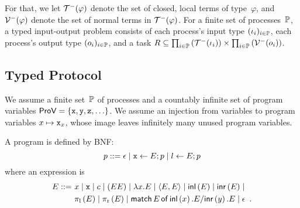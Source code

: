 {For that, we let $\mathcal{T}^-(\varphi)$ denote the set of closed, local terms of
type~$\varphi$,
and $\mathcal{V}^-(\varphi)$ denote the set of normal terms in $\mathcal{T}^-(\varphi)$.
For a finite set of processes~$\mathbb{P}$,
a typed input-output problem consists of each process's input type
$(\iota_i)_{i\in \mathbb{P}}$, each process's output type $(o_i)_{i\in
\mathbb{P}}$, and a
task $R\subseteq \prod_{i\in \mathbb{P}}\left(\mathcal{T}^-(\iota_i)\right)\times
 \prod_{i\in \mathbb{P}}\left(\mathcal{V}^-(o_i)\right)$.

\subsection{Typed Protocol}

We assume a finite set~$\mathbb{P}$
of processes and a countably infinite
set of program variables $\mathsf{ProV} =\{\texttt{x}, \texttt{y}, \texttt{z}, \ldots\}$.
We assume an injection from variables to program variables $x\mapsto
\texttt{x}_x$, whose image leaves infinitely many unused program variables.

A program is defined by BNF:
\[
 p ::= \epsilon\mid
 \texttt{x}\leftarrow E; p \mid
 l \leftarrow E; p
\]
where an expression is
\begin{align*}
 E
 ::=\,\,
 &x\mid \texttt{x} \mid c \mid (EE)\mid \lambda
 x.E\mid \langle{E,E}\rangle\mid \mathsf{inl}\left({E}\right)\mid \mathsf{inr}\left({E}\right)\mid \\
 &\pi_{\mathrm l}\left({E}\right)\mid\pi_{\mathrm r}\left({E}\right)\mid  \mathsf{match}\,{E}\,\mathsf{of}\, \mathsf{inl}\left({x}\right). {E}/ \mathsf{inr}\left({y}\right). {E}\mid \epsilon\enspace.
\end{align*}

}
